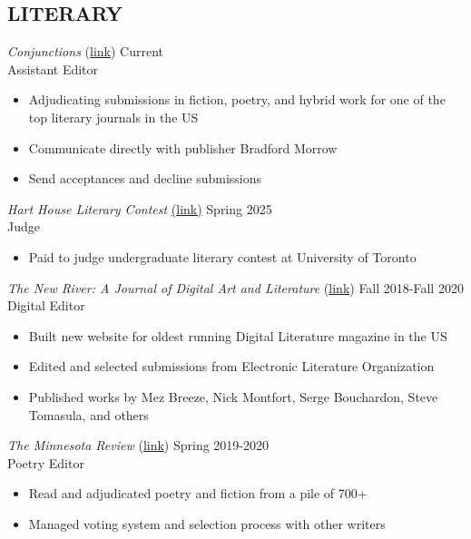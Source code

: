\subsection{LITERARY}

\emph{Conjunctions} (\href{https://conjunctions.com/}{link}) \hfill
 Current \\
 Assistant Editor  \\
 \begin{itemize}
  \item Adjudicating submissions in fiction, poetry, and hybrid work for one of the top literary journals in the US
  \item Communicate directly with publisher Bradford Morrow
  \item Send acceptances and decline submissions 
 \end{itemize}
 
 \emph{Hart House Literary Contest} \href{https://harthouse.ca/opportunities/entry/literary-contest}{(link)}
 \hfill
Spring 2025 \\
Judge  \\
 \begin{itemize}
 \item Paid to judge undergraduate literary contest at University of Toronto
 \end{itemize}
 

\emph{The New River: A Journal of Digital Art and Literature} (\href{http://thenewriver.us/}{link}) \hfill
 Fall 2018-Fall 2020 \\
Digital Editor  \\
 \begin{itemize}
 \item Built new website for oldest running Digital Literature magazine in the US
 \item Edited and selected submissions from Electronic Literature Organization
 \item Published works by Mez Breeze, Nick Montfort, Serge Bouchardon, Steve Tomasula, and others
 \end{itemize}
 
 \emph{The Minnesota Review} (\href{https://read.dukeupress.edu/the-minnesota-review}{link})  \hfill Spring 2019-2020 \\
Poetry Editor \\
 \begin{itemize}
 \item  Read and adjudicated poetry and fiction from a pile of 700+
 \item Managed voting system and selection process with other writers
 \end{itemize}
 
